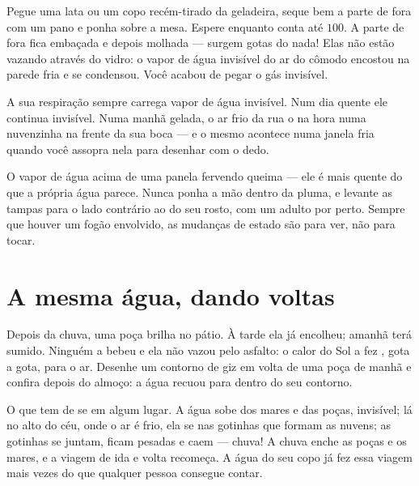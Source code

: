 \begin{example}\label{ex:g2:ice-water-steam:catch}
Pegue uma lata ou um copo recém-tirado da geladeira, seque bem a
parte de fora com um pano e ponha sobre a mesa. Espere enquanto conta
até $100$. A parte de fora fica embaçada e depois molhada --- surgem
gotas do nada! Elas não estão vazando através do vidro: o vapor de
água invisível do ar do cômodo encostou na parede fria e se
condensou. Você acabou de pegar o gás invisível.
\end{example}

\begin{example}\label{ex:g2:ice-water-steam:breath}
A sua respiração sempre carrega vapor de água invisível. Num dia
quente ele continua invisível. Numa manhã gelada, o ar frio da rua o
 na hora numa nuvenzinha na frente da sua boca --- e o mesmo
acontece numa janela fria quando você assopra nela para desenhar com
o dedo.
\end{example}

\begin{remark}\label{rem:g2:ice-water-steam:safety}
O vapor de água acima de uma panela fervendo queima --- ele é mais
quente do que a própria água parece. Nunca ponha a mão dentro da
pluma, e levante as tampas para o lado contrário ao do seu rosto, com
um adulto por perto. Sempre que houver um fogão envolvido, as
mudanças de estado são para ver, não para tocar.
\end{remark}

\section{A mesma água, dando voltas}

\begin{example}\label{ex:g2:ice-water-steam:puddle}
Depois da chuva, uma poça brilha no pátio. À tarde ela já encolheu;
amanhã terá sumido. Ninguém a bebeu e ela não vazou pelo asfalto: o
calor do Sol a fez , gota a gota, para o ar. Desenhe um
contorno de giz em volta de uma poça de manhã e confira depois do
almoço: a água recuou para dentro do seu contorno.
\end{example}

\begin{example}\label{ex:g2:ice-water-steam:cycle}
O que  tem de se  em algum lugar. A água sobe dos
mares e das poças, invisível; lá no alto do céu, onde o ar é frio,
ela se  nas gotinhas que formam as nuvens; as gotinhas se
juntam, ficam pesadas e caem --- chuva! A chuva enche as poças e os
mares, e a viagem de ida e volta recomeça. A água do seu copo já fez
essa viagem mais vezes do que qualquer pessoa consegue contar.
\end{example}

